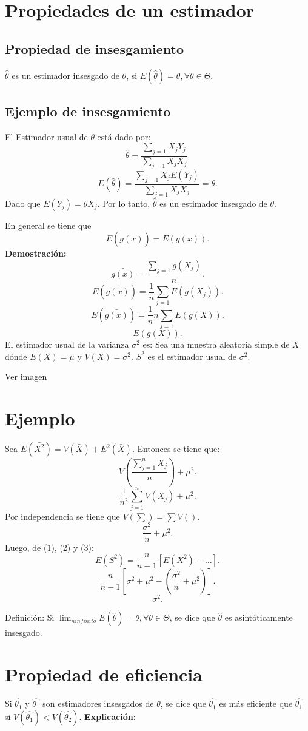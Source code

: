 \documentclass{article}
\begin{document}
\section{Propiedades de un estimador}
\subsection{Propiedad de insesgamiento}
$\hat{\theta}$ es un estimador insesgado de $\theta$, si $E(\hat{\theta})=\theta, \forall \theta \in \Theta$.
\subsection{Ejemplo de insesgamiento}
El Estimador usual de $\theta$ está dado por:
\[  \hat{\theta} = \frac{\sum_{j=1}X_{j}Y_{j}}{\sum_{j=1}X_{j}X_{j}}.\]
\[  E(\hat{\theta})=  \frac{\sum_{j=1}X_{j}E(Y_{j})}{\sum_{j=1}X_{j}X_{j}} = \theta.\]
Dado que $E(Y_{j}) = \theta X_{j}$. Por lo tanto, $\hat{\theta}$ es un estimador insesgado de $\theta$.

En general se tiene que
\[ E(\bar{g(x)}) = E(g(x)).\]
\textbf{Demostración:}
\[ \bar{g(x)}= \frac{\sum_{j=1}g(X_{j})}{n}.\]
\[ E(\bar{g(x)})=  \frac{1}{n} \sum_{j=1} E(g(X_{j})).\]
\[ E(\bar{g(x)})=  \frac{1}{n} n \sum_{j=1} E(g(X)).\]
\[ E(g(X)).\]
El estimador usual de la varianza $\sigma^{2}$ es:
Sea una muestra aleatoria simple de $X$ dónde $E(X)=\mu$ y $V(X)=\sigma^{2}$. $S^{2}$ es el estimador usual de $\sigma^{2}$. 

Ver imagen

\section{Ejemplo}
Sea $E(\bar{X^{2}}) = V(\bar{X}) + E^{2}(\bar{X})$. Entonces se tiene que:
\[ V(\frac{\sum_{j=1}^{n}X_{j}}{n}) + \mu^{2}.\]
\[ \frac{1}{n^{2}} \sum_{j=1}^{n}V(X_{j}) + \mu^{2}.\] Por independencia se tiene que $V(\sum) = \sum V()$.
\[  \frac{\sigma^{2}}{n} + \mu^{2}.\]
Luego, de (1), (2) y (3):
\[ E(S^{2})=  \frac{n}{n-1}[E(X^{2})- \ldots ].\]
\[  \frac{n}{n-1}[\sigma^{2}+\mu^{2}-( \frac{\sigma^{2}}{n} + \mu^{2})].\]
\[ \sigma^{2}.\]

Definición: Si $\lim_{n infinito} E(\hat{\theta})=\theta, \forall \theta \in \Theta$, se dice que $\hat{\theta}$ es asintóticamente insesgado.
\section{Propiedad de eficiencia}
Si $\hat{\theta_{1}}$ y $\hat{\theta_{1}}$ son estimadores insesgados de $\theta$, se dice que $\hat{\theta_{1}}$ es más eficiente que  $\hat{\theta_{1}}$ si $V(\hat{\theta_{1}}) < V(\hat{\theta_{2}})$.
\textbf{Explicación:}
\end{document}
